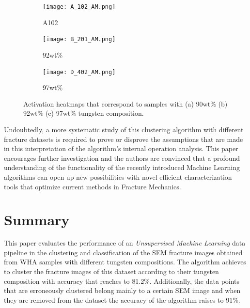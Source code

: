 \documentclass[authoryear,preprint,review,12pt, singleside]{elsarticle}
\begin{document}
\begin{figure}[!h]
	\centering
	\begin{subfigure}[b]{0.45\textwidth}
		\centering
		\texttt{[image: A\_102\_AM.png]}
		\caption{A102}
	\end{subfigure}
	\begin{subfigure}[b]{0.45\textwidth}
		\centering
		\texttt{[image: B\_201\_AM.png]}
		\caption{92wt\%}
	\end{subfigure}
	\begin{subfigure}[b]{0.45\textwidth}
		\centering
		\texttt{[image: D\_402\_AM.png]}
		\caption{97wt\% }
	\end{subfigure}
	\caption{Activation heatmaps that correspond to samples with (a) 90wt\% (b) 92wt\% (c) 97wt\% tungsten composition.}
	\label{fig:ABD_activ}
\end{figure}


Undoubtedly, a more systematic study of this clustering algorithm with different fracture datasets is required to prove or disprove the assumptions that are made in this interpretation of the algorithm's internal operation analysis. This paper encourages further investigation and the authors are convinced that a profound understanding of the functionality of the recently introduced Machine Learning algorithms can open up new possibilities with novel efficient characterization tools that optimize current methods in Fracture Mechanics.          



\section*{Summary}
\label{conclusions_label}

This paper evaluates the performance of an \textit{Unsupervised Machine Learning} data pipeline in the clustering and classification of the SEM fracture images obtained from WHA samples with different tungsten compositions. The algorithm achieves to cluster the fracture images of this dataset according to their tungsten composition with accuracy that reaches to 81.2\%. Additionally, the data points that are erroneously clustered belong mainly to a certain SEM image and when they are removed from the dataset the accuracy of the algorithm raises to 91\%. 
\end{document}
